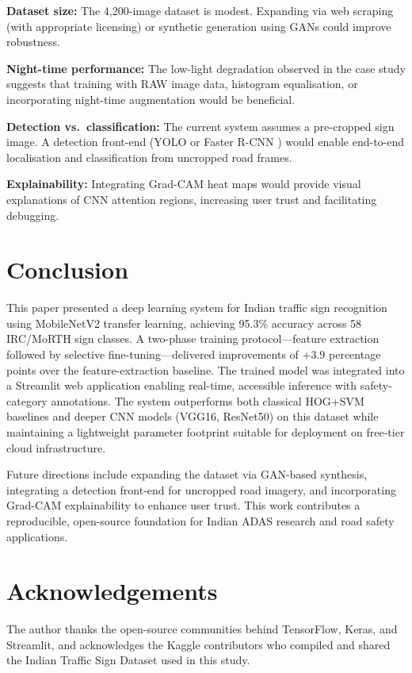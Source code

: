 \documentclass[journal,10pt,twocolumn]{IEEEtran}
\begin{document}
\textbf{Dataset size:} The 4,200-image dataset is modest. Expanding via web
scraping (with appropriate licensing) or synthetic generation using GANs
\cite{goodfellow2014generative} could improve robustness.

\textbf{Night-time performance:} The low-light degradation observed in the
case study suggests that training with RAW image data, histogram equalisation,
or incorporating night-time augmentation would be beneficial.

\textbf{Detection vs.\ classification:} The current system assumes a
pre-cropped sign image. A detection front-end (YOLO \cite{redmon2016you} or
Faster R-CNN \cite{ren2015faster}) would enable end-to-end localisation and
classification from uncropped road frames.

\textbf{Explainability:} Integrating Grad-CAM \cite{selvaraju2017grad} heat
maps would provide visual explanations of CNN attention regions, increasing
user trust and facilitating debugging.

\section{Conclusion}
\label{sec:conclusion}

This paper presented a deep learning system for Indian traffic sign recognition
using MobileNetV2 transfer learning, achieving 95.3\% accuracy across 58
IRC/MoRTH sign classes. A two-phase training protocol—feature extraction
followed by selective fine-tuning—delivered improvements of $+3.9$ percentage
points over the feature-extraction baseline. The trained model was integrated
into a Streamlit web application enabling real-time, accessible inference with
safety-category annotations. The system outperforms both classical HOG+SVM
baselines and deeper CNN models (VGG16, ResNet50) on this dataset while
maintaining a lightweight parameter footprint suitable for deployment on
free-tier cloud infrastructure.

Future directions include expanding the dataset via GAN-based synthesis,
integrating a detection front-end for uncropped road imagery, and incorporating
Grad-CAM explainability to enhance user trust. This work contributes a
reproducible, open-source foundation for Indian ADAS research and road safety
applications.

\section*{Acknowledgements}
The author thanks the open-source communities behind TensorFlow, Keras, and
Streamlit, and acknowledges the Kaggle contributors who compiled and shared the
Indian Traffic Sign Dataset used in this study.



\end{document}
